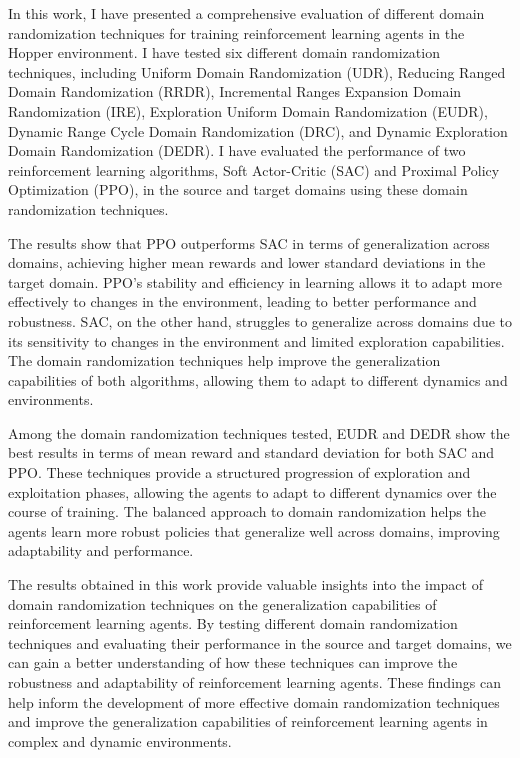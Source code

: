 \documentclass[11pt]{article}
\begin{document}
In this work, I have presented a comprehensive evaluation of different domain randomization techniques for training reinforcement learning agents in the Hopper environment. I have tested six different domain randomization techniques, including Uniform Domain Randomization (UDR), Reducing Ranged Domain Randomization (RRDR), Incremental Ranges Expansion Domain Randomization (IRE), Exploration Uniform Domain Randomization (EUDR), Dynamic Range Cycle Domain Randomization (DRC), and Dynamic Exploration Domain Randomization (DEDR). I have evaluated the performance of two reinforcement learning algorithms, Soft Actor-Critic (SAC) and Proximal Policy Optimization (PPO), in the source and target domains using these domain randomization techniques.

The results show that PPO outperforms SAC in terms of generalization across domains, achieving higher mean rewards and lower standard deviations in the target domain. PPO's stability and efficiency in learning allows it to adapt more effectively to changes in the environment, leading to better performance and robustness. SAC, on the other hand, struggles to generalize across domains due to its sensitivity to changes in the environment and limited exploration capabilities. The domain randomization techniques help improve the generalization capabilities of both algorithms, allowing them to adapt to different dynamics and environments.

Among the domain randomization techniques tested, EUDR and DEDR show the best results in terms of mean reward and standard deviation for both SAC and PPO. These techniques provide a structured progression of exploration and exploitation phases, allowing the agents to adapt to different dynamics over the course of training. The balanced approach to domain randomization helps the agents learn more robust policies that generalize well across domains, improving adaptability and performance.

The results obtained in this work provide valuable insights into the impact of domain randomization techniques on the generalization capabilities of reinforcement learning agents. By testing different domain randomization techniques and evaluating their performance in the source and target domains, we can gain a better understanding of how these techniques can improve the robustness and adaptability of reinforcement learning agents. These findings can help inform the development of more effective domain randomization techniques and improve the generalization capabilities of reinforcement learning agents in complex and dynamic environments.
\end{document}
